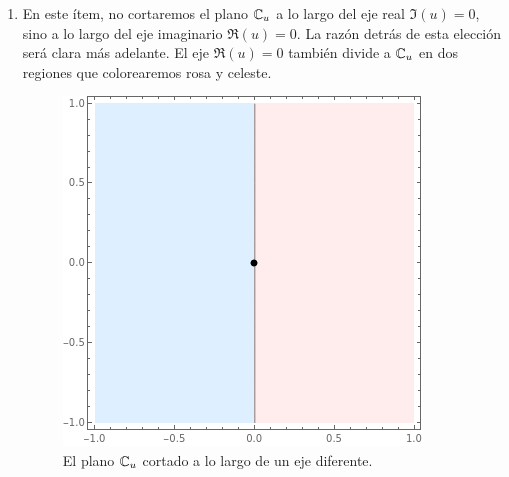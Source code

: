 \begin{solution}
\begin{itemize}
\begin{enumerate}[label=\alph*)]
        \item En este ítem, no cortaremos el plano $\mathbb C_u$ a lo largo del eje real $\Im(u) = 0$, sino a lo largo del eje imaginario $\Re(u) = 0$. La razón detrás de esta elección será clara más adelante. El eje $\Re(u) = 0$ también divide a $\mathbb C_u$ en dos regiones que colorearemos rosa y celeste.
        \begin{figure}[h]
            \centering
            \includegraphics[scale=0.4]{ramification/6-u.png}
            \caption{El plano $\mathbb C_u$ cortado a lo largo de un eje diferente.}
        \end{figure}
        

\end{enumerate}
\end{itemize}
\end{solution}
